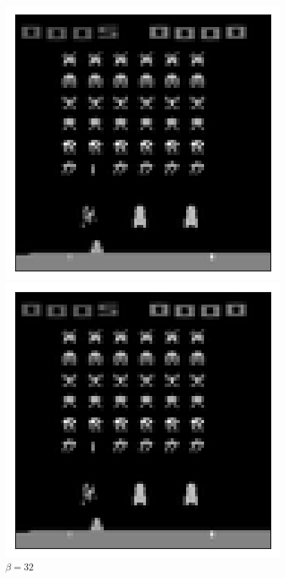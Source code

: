\begin{figure}[h!]
\begin{multicols}{4}
    \includegraphics[scale=0.4]{figures/results/weighted_average/beta_4_sample_0_reconstructed.png}
    \caption{$\beta = 4$}
    \includegraphics[scale=0.4]{figures/results/weighted_average/beta_32_sample_0_reconstructed.png}
    \caption{$\beta = 32$}
\end{multicols}
\begin{multicols}{4}

\end{multicols}
\end{figure}
